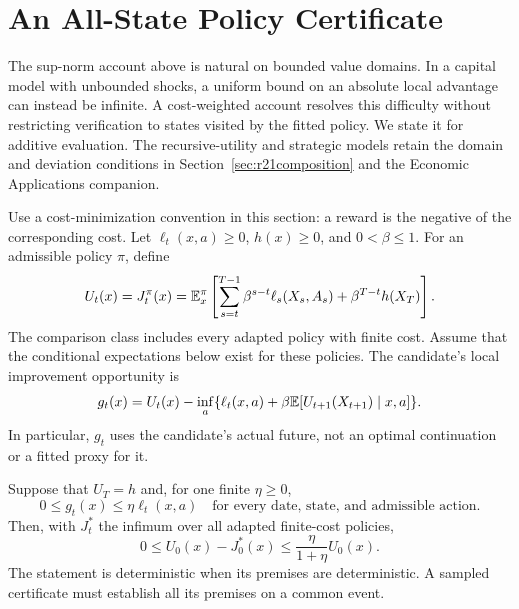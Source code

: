 \section{An All-State Policy Certificate}\label{sec:r23policy}
The sup-norm account above is natural on bounded value domains. In a capital
model with unbounded shocks, a uniform bound on an absolute local advantage
can instead be infinite. A cost-weighted account resolves this difficulty
without restricting verification to states visited by the fitted policy.
We state it for additive evaluation. The recursive-utility and strategic
models retain the domain and deviation conditions in
Section~\ref{sec:r21composition} and the Economic Applications companion.

Use a cost-minimization convention in this section: a reward is the negative
of the corresponding cost. Let $\ell_t(x,a)\geq0$, $h(x)\geq0$, and
$0<\beta\leq1$. For an admissible policy $\pi$, define
\begin{equation}
 U_t(x)=J_t^\pi(x)=\mathbb E_x^\pi\left[
 \sum_{s=t}^{T-1}\beta^{s-t}\ell_s(X_s,A_s)+\beta^{T-t}h(X_T)\right].
 \label{eq:r23ownvalue}
\end{equation}
The comparison class includes every adapted policy with finite cost. Assume
that the conditional expectations below exist for these policies. The
candidate's local improvement opportunity is
\begin{equation}
 g_t(x)=U_t(x)-\inf_a\{\ell_t(x,a)+\beta\mathbb E[U_{t+1}(X_{t+1})\mid x,a]\}.
 \label{eq:r23advantage}
\end{equation}
In particular, $g_t$ uses the candidate's actual future, not an optimal
continuation or a fitted proxy for it.

\begin{theorem}\label{thm:r23coercive}
Suppose that $U_T=h$ and, for one finite $\eta\geq0$,
\begin{equation}
 0\leq g_t(x)\leq\eta\ell_t(x,a)
 \quad\text{for every date, state, and admissible action.}
 \label{eq:r23coercivity}
\end{equation}
Then, with $J_t^*$ the infimum over all adapted finite-cost policies,
\begin{equation}
 0\leq U_0(x)-J_0^*(x)
 \leq\frac{\eta}{1+\eta}U_0(x).
 \label{eq:r23relative}
\end{equation}
The statement is deterministic when its premises are deterministic. A
sampled certificate must establish all its premises on a common event.
\end{theorem}

